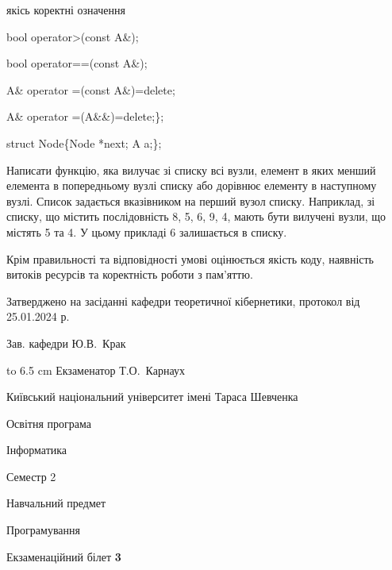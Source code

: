 \documentclass[12pt, ukrainian]{article}
\begin{document}
{\quad  якісь коректні означення 

\quad  bool operator>(const A\&); 

\quad  bool operator==(const A\&); 

\quad A\& operator =(const A\&)=delete; 

\quad  A\& operator =(A\&\&)=delete;\};

struct Node\{Node *next; A a;\};

 Написати функцію, яка вилучає зі списку всі вузли, елемент в яких менший елемента в попередньому вузлі списку або дорівнює елементу в наступному вузлі. Список задається вказівником на перший вузол списку. Наприклад, зі списку, що містить послідовність 8, 5, 6, 9, 4, мають бути вилучені вузли, що містять 5 та 4. У цьому прикладі 6 залишається в списку.

Крім правильності та відповідності умові оцінюється якість коду, наявність витоків ресурсів та коректність роботи з пам'яттю. 

}
{\smallskip\smallskip \begin {scriptsize} Затверджено на засіданні кафедри теоретичної кібернетики, протокол   від   25.01.2024 р.\par\smallskip\smallskip\smallskip\smallskip
{\parbox {6.5 cm} {Зав. кафедри \dotfill Ю.В.~Крак}}\hspace {0.7cm} {\hbox to 6.5 cm { Екзаменатор \dotfill Т.О.~Карнаух}} \end{scriptsize}}
\newpage
{{\begin {scriptsize}\par
{ \center  Київський національний університет імені Тараса Шевченка \par}
{\parbox {5 cm}{Освітня програма \hfill}{\parbox {7 cm}{Інформатика\hfill}}\parbox {6 cm}{\hfill Семестр 2}}\par
{\parbox {5 cm} {Навчальний предмет \hfill}\parbox {7 cm}{Програмування \hfill}\parbox {6cm}{\hfill}\par}\vspace{-15pt} \end{scriptsize}}{\center Екзаменаційний білет \No \textbf { 3 }\par}}
\end{document}
